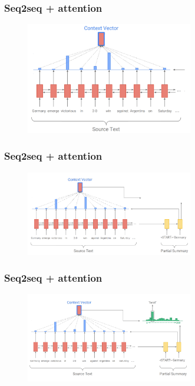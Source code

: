 \documentclass{tum-presentation}
\begin{document}
\begin{frame}
	\frametitle{Seq2seq + attention}
	\begin{figure}
		\centering
		\includegraphics[width=0.65\textwidth,keepaspectratio=true]{tum-resources/images/p_summ_2.png}
		\label{fig:p_summ_2}
	\end{figure}
\end{frame}

\begin{frame}
	\frametitle{Seq2seq + attention}
	\begin{figure}
		\centering
		\includegraphics[width=0.65\textwidth,keepaspectratio=true]{tum-resources/images/p_summ_3.png}
		\label{fig:p_summ_3}
	\end{figure}
\end{frame}

\begin{frame}
	\frametitle{Seq2seq + attention}
	\begin{figure}
		\centering
		\includegraphics[width=0.65\textwidth,keepaspectratio=true]{tum-resources/images/p_summ_4.png}
		\label{fig:p_summ_4}
	\end{figure}
\end{frame}
\end{document}
